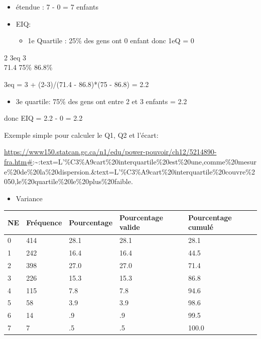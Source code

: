 \documentclass[
]{article}
\providecommand{\tightlist}{%
  \setlength{\itemsep}{0pt}\setlength{\parskip}{0pt}}
\begin{document}
\begin{itemize}
\item
  étendue : 7 - 0 = 7 enfants
\item
  EIQ:

  \begin{itemize}
  \tightlist
  \item
    1e Quartile : 25\% des gens ont 0 enfant donc 1eQ = 0
  \end{itemize}
\end{itemize}

2 3eq 3\\
71.4 75\% 86.8\%

3eq = 3 + (2-3)/(71.4 - 86.8)*(75 - 86.8) = 2.2

\begin{itemize}
\tightlist
\item
  3e quartile: 75\% des gens ont entre 2 et 3 enfants = 2.2
\end{itemize}

donc EIQ = 2.2 - 0 = 2.2

Exemple simple pour calculer le Q1, Q2 et l'écart:

\url{https://www150.statcan.gc.ca/n1/edu/power-pouvoir/ch12/5214890-fra.htm\#}:\textasciitilde:text=L'\%C3\%A9cart\%20interquartile\%20est\%20une,comme\%20mesure\%20de\%20la\%20dispersion.\&text=L'\%C3\%A9cart\%20interquartile\%20couvre\%2050,le\%20quartile\%20le\%20plus\%20faible.

\begin{itemize}
\tightlist
\item
  Variance
\end{itemize}

\begin{longtable}[]{@{}lllll@{}}
\toprule()
NE & Fréquence & Pourcentage & Pourcentage valide & Pourcentage
cumulé \\
\midrule()
\endhead
0 & 414 & 28.1 & 28.1 & 28.1 \\
1 & 242 & 16.4 & 16.4 & 44.5 \\
2 & 398 & 27.0 & 27.0 & 71.4 \\
3 & 226 & 15.3 & 15.3 & 86.8 \\
4 & 115 & 7.8 & 7.8 & 94.6 \\
5 & 58 & 3.9 & 3.9 & 98.6 \\
6 & 14 & .9 & .9 & 99.5 \\
7 & 7 & .5 & .5 & 100.0 \\
\bottomrule()
\end{longtable}
\end{document}
